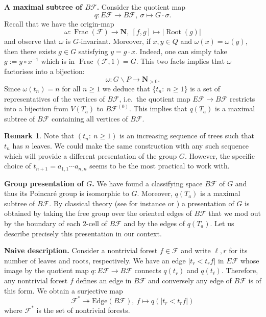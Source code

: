 \documentclass[a4paper, 12pt]{amsart}
\numberwithin{equation}{section}
\theoremstyle{definition}
\newtheorem{remark}[theorem]{Remark}
\newcommand{\bs}{\backslash}
\newcommand{\cF}{\mathcal F}
\DeclareMathOperator{\Frac}{Frac}
\newcommand{\N}{\mathbf{N}}
\newcommand{\onto}{\twoheadrightarrow}
\DeclareMathOperator{\Root}{Root}
\begin{document}
{\bf A maximal subtree of $B\cF$.}
Consider the quotient map $$q:E\cF\to B\cF,\ \sigma\mapsto G\cdot\sigma.$$
Recall that we have the origin-map 
$$\omega:\Frac(\cF)\to\N, \ [f,g]\mapsto |\Root(g)|$$ 
and observe that $\omega$ is $G$-invariant.
Moreover, if $x,y\in Q$ and $\omega(x)=\omega(y)$, then there exists $g\in G$ satisfying $y=g\cdot x.$
Indeed, one can simply take $g:= y\circ x^{-1}$ which is in $\Frac(\cF,1)=G$.
This two facts implies that $\omega$ factorises into a bijection:
$$\omega:G\bs P\to \N_{>0}.$$
Since $\omega(t_n)=n$ for all $n\geq 1$ we deduce that $\{t_n:\ n\geq 1\}$ is a set of representatives of the vertices of $B\cF$, i.e.~the quotient map $E\cF\to B\cF$ restricts into a bijection from $V(T_a)$ to $B\cF^{(0)}$.
This implies that $q(T_a)$ is a maximal subtree of $B\cF$ containing all vertices of $B\cF$.

\begin{remark}
Note that $(t_n:\ n\geq 1)$ is an increasing sequence of trees such that $t_n$ has $n$ leaves.
We could make the same construction with any such sequence which will provide a different presentation of the group $G$.
However, the specific choice of $t_{n+1}=a_{1,1}\cdots a_{n,n}$ seems to be the most practical to work with. 
\end{remark}

{\bf Group presentation of $G$.}
We have found a classifying space $B\cF$ of $G$ and thus its Poincar\'e group is isomorphic to $G$. 
Moreover, $q(T_a)$ is a maximal subtree of $B\cF$. 
By classical theory (see for instance \cite[Chapter 4]{Stillwell-book} or \cite[Theorem 3.1.16]{Geoghegan-book}) a presentation of $G$ is obtained by taking the free group over the oriented edges of $B\cF$ that we mod out by the boundary of each 2-cell of $B\cF$ and by the edges of $q(T_a)$.
Let us describe precisely this presentation in our context.

{\bf Naive description.}
Consider a nontrivial forest $f\in\cF$ and write $\ell,r$ for its number of leaves and roots, respectively.
We have an edge $|t_r<t_rf|$ in $E\cF$ whose image by the quotient map $q:E\cF\to B\cF$ connects $q(t_r)$ and $q(t_\ell)$.
Therefore, any nontrivial forest $f$ defines an edge in $B\cF$ and conversely any edge of $B\cF$ is of this form.
We obtain a surjective map
$$\cF^*\onto \text{Edge}(B\cF),\ f\mapsto q(|t_r<t_rf|)$$
where $\cF^*$ is the set of nontrivial forests.
\end{document}
